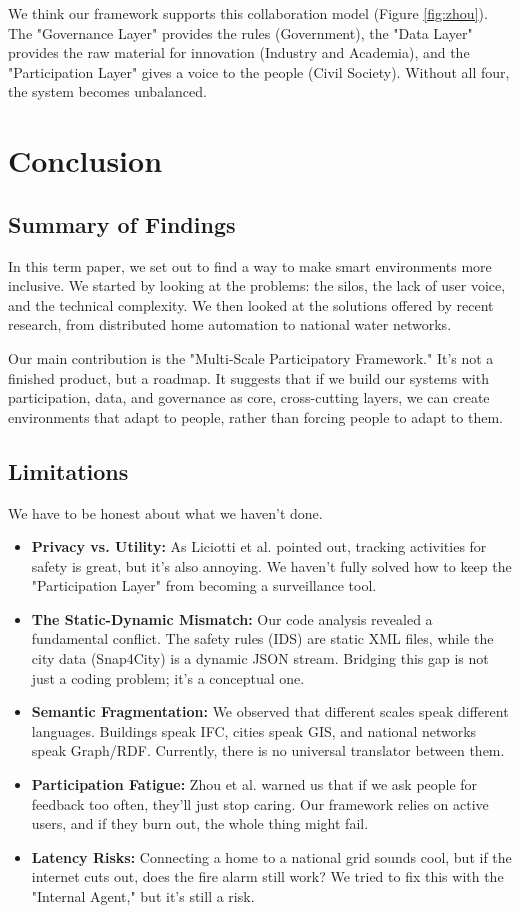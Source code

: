 \documentclass[a4paper,oneside,12pt]{report}
\begin{document}
We think our framework supports this collaboration model (Figure \ref{fig:zhou}). The "Governance Layer" provides the rules (Government), the "Data Layer" provides the raw material for innovation (Industry and Academia), and the "Participation Layer" gives a voice to the people (Civil Society). Without all four, the system becomes unbalanced.

\chapter{Conclusion}

\section{Summary of Findings}
In this term paper, we set out to find a way to make smart environments more inclusive. We started by looking at the problems: the silos, the lack of user voice, and the technical complexity. We then looked at the solutions offered by recent research, from distributed home automation to national water networks.

Our main contribution is the "Multi-Scale Participatory Framework." It's not a finished product, but a roadmap. It suggests that if we build our systems with participation, data, and governance as core, cross-cutting layers, we can create environments that adapt to people, rather than forcing people to adapt to them.

\section{Limitations}
We have to be honest about what we haven't done.
\begin{itemize}
    \item \textbf{Privacy vs. Utility:} As Liciotti et al.\cite{Liciotti2020} pointed out, tracking activities for safety is great, but it's also annoying. We haven't fully solved how to keep the "Participation Layer" from becoming a surveillance tool.
    \item \textbf{The Static-Dynamic Mismatch:} Our code analysis revealed a fundamental conflict. The safety rules (IDS) are static XML files, while the city data (Snap4City) is a dynamic JSON stream. Bridging this gap is not just a coding problem; it's a conceptual one.
    \item \textbf{Semantic Fragmentation:} We observed that different scales speak different languages. Buildings speak IFC, cities speak GIS, and national networks speak Graph/RDF. Currently, there is no universal translator between them.
    \item \textbf{Participation Fatigue:} Zhou et al.\cite{Zhou2024} warned us that if we ask people for feedback too often, they'll just stop caring. Our framework relies on active users, and if they burn out, the whole thing might fail.
    \item \textbf{Latency Risks:} Connecting a home to a national grid sounds cool, but if the internet cuts out, does the fire alarm still work? We tried to fix this with the "Internal Agent," but it's still a risk.
\end{itemize}
\end{document}
